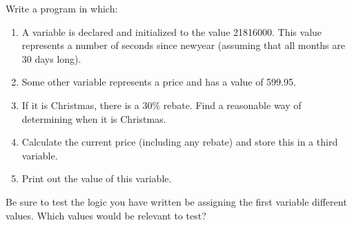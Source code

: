 Write a program in which:

\begin{enumerate}
  \item A variable is declared and initialized to the value 21816000. This value represents a number of seconds since newyear (assuming that all months are 30 days long).
  \item Some other variable represents a price and has a value of 599.95.
  \item If it is Christmas, there is a 30\% rebate. Find a reasonable way of determining when it is Christmas.
  \item Calculate the current price (including any rebate) and store this in a third variable.
  \item Print out the value of this variable.
\end{enumerate}

Be sure to test the logic you have written be assigning the first variable different values. Which values would be relevant to test?
